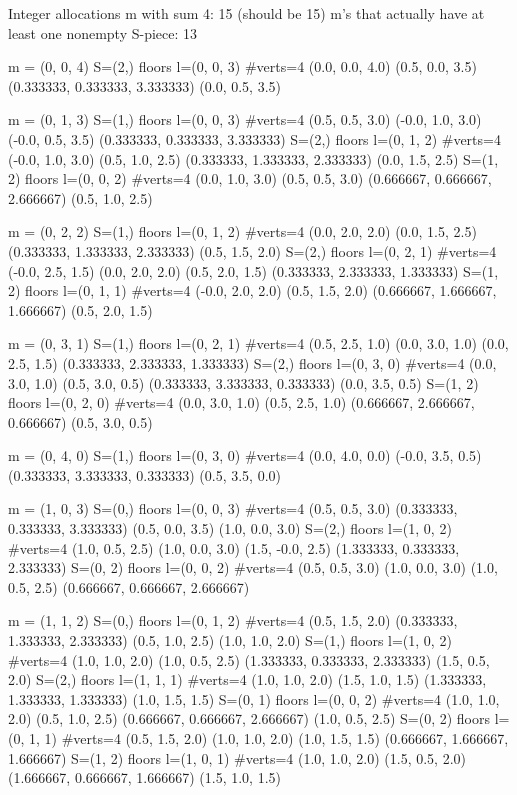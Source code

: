 Integer allocations m with sum 4: 15 (should be 15)
m's that actually have at least one nonempty S-piece: 13

m = (0, 0, 4)
  S=(2,)  floors l=(0, 0, 3)  #verts=4
     (0.0, 0.0, 4.0)
     (0.5, 0.0, 3.5)
     (0.333333, 0.333333, 3.333333)
     (0.0, 0.5, 3.5)

m = (0, 1, 3)
  S=(1,)  floors l=(0, 0, 3)  #verts=4
     (0.5, 0.5, 3.0)
     (-0.0, 1.0, 3.0)
     (-0.0, 0.5, 3.5)
     (0.333333, 0.333333, 3.333333)
  S=(2,)  floors l=(0, 1, 2)  #verts=4
     (-0.0, 1.0, 3.0)
     (0.5, 1.0, 2.5)
     (0.333333, 1.333333, 2.333333)
     (0.0, 1.5, 2.5)
  S=(1, 2)  floors l=(0, 0, 2)  #verts=4
     (0.0, 1.0, 3.0)
     (0.5, 0.5, 3.0)
     (0.666667, 0.666667, 2.666667)
     (0.5, 1.0, 2.5)

m = (0, 2, 2)
  S=(1,)  floors l=(0, 1, 2)  #verts=4
     (0.0, 2.0, 2.0)
     (0.0, 1.5, 2.5)
     (0.333333, 1.333333, 2.333333)
     (0.5, 1.5, 2.0)
  S=(2,)  floors l=(0, 2, 1)  #verts=4
     (-0.0, 2.5, 1.5)
     (0.0, 2.0, 2.0)
     (0.5, 2.0, 1.5)
     (0.333333, 2.333333, 1.333333)
  S=(1, 2)  floors l=(0, 1, 1)  #verts=4
     (-0.0, 2.0, 2.0)
     (0.5, 1.5, 2.0)
     (0.666667, 1.666667, 1.666667)
     (0.5, 2.0, 1.5)

m = (0, 3, 1)
  S=(1,)  floors l=(0, 2, 1)  #verts=4
     (0.5, 2.5, 1.0)
     (0.0, 3.0, 1.0)
     (0.0, 2.5, 1.5)
     (0.333333, 2.333333, 1.333333)
  S=(2,)  floors l=(0, 3, 0)  #verts=4
     (0.0, 3.0, 1.0)
     (0.5, 3.0, 0.5)
     (0.333333, 3.333333, 0.333333)
     (0.0, 3.5, 0.5)
  S=(1, 2)  floors l=(0, 2, 0)  #verts=4
     (0.0, 3.0, 1.0)
     (0.5, 2.5, 1.0)
     (0.666667, 2.666667, 0.666667)
     (0.5, 3.0, 0.5)

m = (0, 4, 0)
  S=(1,)  floors l=(0, 3, 0)  #verts=4
     (0.0, 4.0, 0.0)
     (-0.0, 3.5, 0.5)
     (0.333333, 3.333333, 0.333333)
     (0.5, 3.5, 0.0)

m = (1, 0, 3)
  S=(0,)  floors l=(0, 0, 3)  #verts=4
     (0.5, 0.5, 3.0)
     (0.333333, 0.333333, 3.333333)
     (0.5, 0.0, 3.5)
     (1.0, 0.0, 3.0)
  S=(2,)  floors l=(1, 0, 2)  #verts=4
     (1.0, 0.5, 2.5)
     (1.0, 0.0, 3.0)
     (1.5, -0.0, 2.5)
     (1.333333, 0.333333, 2.333333)
  S=(0, 2)  floors l=(0, 0, 2)  #verts=4
     (0.5, 0.5, 3.0)
     (1.0, 0.0, 3.0)
     (1.0, 0.5, 2.5)
     (0.666667, 0.666667, 2.666667)

m = (1, 1, 2)
  S=(0,)  floors l=(0, 1, 2)  #verts=4
     (0.5, 1.5, 2.0)
     (0.333333, 1.333333, 2.333333)
     (0.5, 1.0, 2.5)
     (1.0, 1.0, 2.0)
  S=(1,)  floors l=(1, 0, 2)  #verts=4
     (1.0, 1.0, 2.0)
     (1.0, 0.5, 2.5)
     (1.333333, 0.333333, 2.333333)
     (1.5, 0.5, 2.0)
  S=(2,)  floors l=(1, 1, 1)  #verts=4
     (1.0, 1.0, 2.0)
     (1.5, 1.0, 1.5)
     (1.333333, 1.333333, 1.333333)
     (1.0, 1.5, 1.5)
  S=(0, 1)  floors l=(0, 0, 2)  #verts=4
     (1.0, 1.0, 2.0)
     (0.5, 1.0, 2.5)
     (0.666667, 0.666667, 2.666667)
     (1.0, 0.5, 2.5)
  S=(0, 2)  floors l=(0, 1, 1)  #verts=4
     (0.5, 1.5, 2.0)
     (1.0, 1.0, 2.0)
     (1.0, 1.5, 1.5)
     (0.666667, 1.666667, 1.666667)
  S=(1, 2)  floors l=(1, 0, 1)  #verts=4
     (1.0, 1.0, 2.0)
     (1.5, 0.5, 2.0)
     (1.666667, 0.666667, 1.666667)
     (1.5, 1.0, 1.5)

